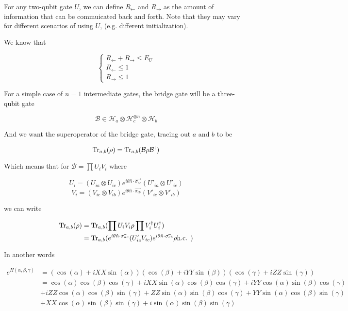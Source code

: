 \documentclass{report}
\begin{document}
For any two-qubit gate $U$, we can define $R_\leftarrow$ and $R_\rightarrow$ as the amount of information that can be commuicated back and forth. Note that they may vary for different scenarios of using $U$, (e.g. different initialization).

We know that

\begin{equation}
  \begin{cases} 
    R_{\leftarrow} + R_{\rightarrow} \le E_U \\
    R_{\leftarrow} \le 1 \\
    R_{\rightarrow} \le 1
  \end{cases}
\end{equation}

For a simple case of $n=1$ intermediate gates, the bridge gate will be a three-qubit gate

\begin{equation}
  \mathcal{B} \in \mathcal{H}_a \otimes \mathcal{H}_c^{\otimes n} \otimes \mathcal{H}_b
\end{equation}

And we want the superoperator of the bridge gate, tracing out $a$ and $b$ to be

\begin{equation}
  \Tr_{a, b}(\rho) = \Tr_{a, b}(\mathcal{B} \rho \mathcal{B}^\dagger)
\end{equation}


Which means that for $\mathcal{B} = \prod U_i V_i$ where

\begin{equation}
  U_i = (U_{ia}\otimes U_{ic}) e^{i\theta \hat n \cdot \vec{\sigma_{ac}}} (U'_{ia} \otimes U'_{ic})
\end{equation}
\begin{equation}
  V_i = (V_{ic}\otimes V_{ib}) e^{i\theta \hat n \cdot \vec{\sigma_{cb}}} (V'_{ic} \otimes V'_{ib})
\end{equation}

we can write 

\begin{align}
  \Tr_{a, b}(\rho) &= \Tr_{a, b}(\prod U_i V_i \rho \prod V_i^\dagger U_i^\dagger) \\
  &= \Tr_{a, b}( e^{i\theta \hat n \cdot \vec{\sigma_{ac}}} (U'_{ic} V_{ic}) e^{i\theta \hat n \cdot \vec{\sigma_{cb}}} \rho \text{h.c. } )
\end{align}

In another words

\begin{align}
  e^{H(\alpha,\beta,\gamma)} &= (\cos(\alpha) + i XX \sin(\alpha)) (\cos(\beta) + i YY \sin(\beta)) (\cos(\gamma) + i ZZ \sin(\gamma)) \\
  &= \cos(\alpha) \cos(\beta) \cos(\gamma) 
  +i XX \sin(\alpha)\cos(\beta)\cos(\gamma)
  +i YY \cos(\alpha)\sin(\beta)\cos(\gamma)
  \\ &
  +i ZZ \cos(\alpha)\cos(\beta)\sin(\gamma)
  +ZZ \sin(\alpha)\sin(\beta)\cos(\gamma)
  +YY \sin(\alpha)\cos(\beta)\sin(\gamma)
  \\ &
  +XX \cos(\alpha)\sin(\beta)\sin(\gamma)
  +i \sin(\alpha)\sin(\beta)\sin(\gamma)
\end{align}
  
\end{document}
